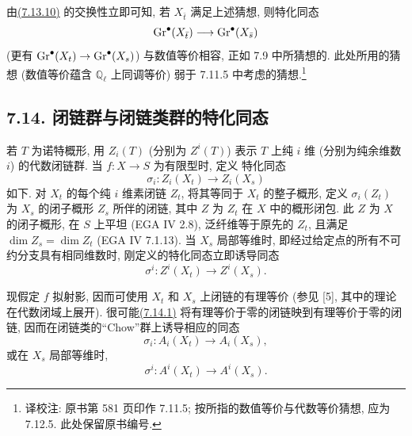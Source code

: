 由\hyperlink{sga6.e10.eq.7-13-10}{(7.13.10)} 的交换性立即可知, 若 $X_{\bar t}$ 满足上述猜想, 则特化同态
%
%
\[
\operatorname{Gr}^\bullet(X_{\bar t})\longrightarrow\operatorname{Gr}^\bullet(X_{\bar s})
\]
(更有 $\operatorname{Gr}^\bullet(X_t)\to\operatorname{Gr}^\bullet(X_s)$) 与数值等价相容, 正如 7.9 中所猜想的. 此处所用的猜想 (数值等价蕴含 $\mathbb Q_\ell$ 上同调等价) 弱于 7.11.5 中考虑的猜想.\footnote{译校注: 原书第 581 页印作 7.11.5; 按所指的数值等价与代数等价猜想, 应为 7.12.5. 此处保留原书编号.}
%
%
%

\subsection*{7.14. 闭链群与闭链类群的特化同态} 若 $T$ 为诺特概形, 用 $Z_i(T)$ (分别为 $Z^i(T)$) 表示 $T$ 上纯 $i$ 维 (分别为纯余维数 $i$) 的代数闭链群. 当 $f:X\to S$ 为有限型时, 定义
%
%
%
%
特化同态
\begin{equation}\tag{7.14.1}
\sigma_i:Z_i(X_t)\longrightarrow Z_i(X_s)
\end{equation}
如下. 对 $X_t$ 的每个纯 $i$ 维素闭链 $Z_t$, 将其等同于 $X_t$ 的整子概形, 定义 $\sigma_i(Z_t)$ 为 $X_s$ 的闭子概形 $Z_s$ 所伴的闭链, 其中 $Z$ 为 $Z_t$ 在 $X$ 中的概形闭包. 此 $Z$ 为 $X$ 的闭子概形, 在 $S$ 上平坦 (EGA IV 2.8), 泛纤维等于原先的 $Z_t$, 且满足 $\dim Z_s=\dim Z_t$ (EGA IV 7.1.13). 当 $X_s$ 局部等维时, 即经过给定点的所有不可约分支具有相同维数时, 刚定义的特化同态立即诱导同态
%
%
%
%
%
%
%
%
\begin{equation}\tag{7.14.1 bis}
\sigma^i:Z^i(X_t)\longrightarrow Z^i(X_s).
\end{equation}

现假定 $f$ 拟射影, 因而可使用 $X_t$ 和 $X_s$ 上闭链的有理等价 (参见 [5], 其中的理论在代数闭域上展开). 很可能\hyperlink{sga6.e10.eq.7-14-1}{(7.14.1)} 将有理等价于零的闭链映到有理等价于零的闭链, 因而在闭链类的“Chow”群上诱导相应的同态
%
%
%
%
%
\begin{equation}\tag{7.14.2}
\sigma_i:A_i(X_t)\longrightarrow A_i(X_s),
\end{equation}
或在 $X_s$ 局部等维时,
\begin{equation}\tag{7.14.2 bis}
\sigma^i:A^i(X_t)\longrightarrow A^i(X_s).
\end{equation}

